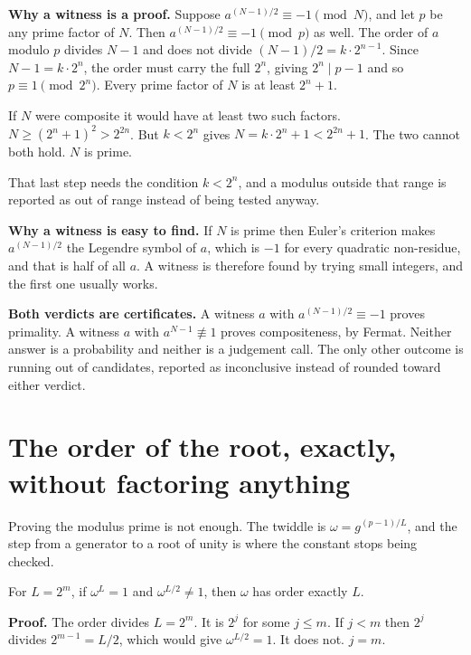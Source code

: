 \textbf{Why a witness is a proof.} Suppose \(a^{(N-1)/2} \equiv -1 \pmod N\), and let \(p\) be any prime factor of \(N\). Then \(a^{(N-1)/2} \equiv -1 \pmod p\) as well. The order of \(a\) modulo \(p\) divides \(N-1\) and does not divide \((N-1)/2 = k \cdot 2^{n-1}\). Since \(N - 1 = k \cdot 2^n\), the order must carry the full \(2^n\), giving \(2^n \mid p-1\) and so \(p \equiv 1 \pmod{2^n}\). Every prime factor of \(N\) is at least \(2^n + 1\).

If \(N\) were composite it would have at least two such factors. \(N \ge (2^n+1)^2 > 2^{2n}\). But \(k < 2^n\) gives \(N = k \cdot 2^n + 1 < 2^{2n} + 1\). The two cannot both hold. \(N\) is prime. \qedsymbol

That last step needs the condition \(k < 2^n\), and a modulus outside that range is reported as out of range instead of being tested anyway.

\textbf{Why a witness is easy to find.} If \(N\) is prime then Euler's criterion makes \(a^{(N-1)/2}\) the Legendre symbol of \(a\), which is \(-1\) for every quadratic non-residue, and that is half of all \(a\). A witness is therefore found by trying small integers, and the first one usually works.

\textbf{Both verdicts are certificates.} A witness \(a\) with \(a^{(N-1)/2} \equiv -1\) proves primality. A witness \(a\) with \(a^{N-1} \not\equiv 1\) proves compositeness, by Fermat. Neither answer is a probability and neither is a judgement call. The only other outcome is running out of candidates, reported as inconclusive instead of rounded toward either verdict.

\section{The order of the root, exactly, without factoring anything}

Proving the modulus prime is not enough. The twiddle is \(\omega = g^{(p-1)/L}\), and the step from a generator to a root of unity is where the constant stops being checked.

\begin{proposition}
For \(L = 2^m\), if \(\omega^L = 1\) and \(\omega^{L/2} \ne 1\), then \(\omega\) has order exactly \(L\).
\end{proposition}

\textbf{Proof.} The order divides \(L = 2^m\). It is \(2^j\) for some \(j \le m\). If \(j < m\) then \(2^j\) divides \(2^{m-1} = L/2\), which would give \(\omega^{L/2} = 1\). It does not. \(j = m\). \qedsymbol

